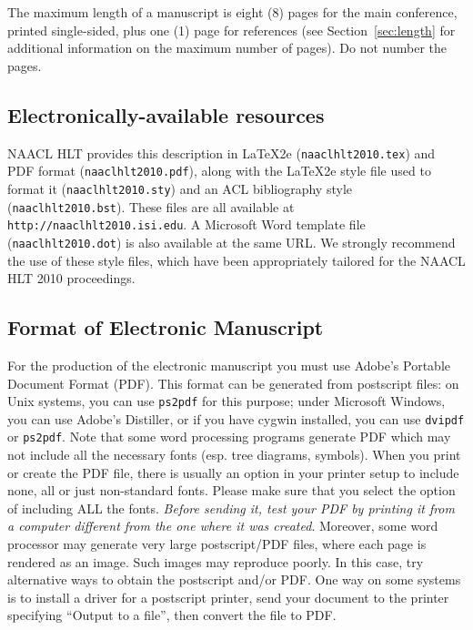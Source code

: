 \documentclass[11pt,letterpaper]{article}
\begin{document}
The maximum length of a manuscript is eight (8) pages for the main
conference, printed single-sided, plus one (1) page for references
(see Section~\ref{sec:length} for additional information on the
maximum number of pages).  Do not number the pages.

\subsection{Electronically-available resources}

NAACL HLT provides this description in \LaTeX2e{} ({\tt naaclhlt2010.tex}) and PDF
format ({\tt naaclhlt2010.pdf}), along with the \LaTeX2e{} style file used to
format it ({\tt naaclhlt2010.sty}) and an ACL bibliography style ({\tt naaclhlt2010.bst}).
These files are all available at
{\tt http://naaclhlt2010.isi.edu}.  A Microsoft Word
template file ({\tt naaclhlt2010.dot}) is also available at the same URL. We
strongly recommend the use of these style files, which have been
appropriately tailored for the NAACL HLT 2010 proceedings.


\subsection{Format of Electronic Manuscript}
\label{sect:pdf}

For the production of the electronic manuscript you must use Adobe's
Portable Document Format (PDF). This format can be generated from
postscript files: on Unix systems, you can use {\tt ps2pdf} for this
purpose; under Microsoft Windows, you can use Adobe's Distiller, or
if you have cygwin installed, you can use {\tt dvipdf} or
{\tt ps2pdf}.  Note 
that some word processing programs generate PDF which may not include
all the necessary fonts (esp. tree diagrams, symbols). When you print
or create the PDF file, there is usually an option in your printer
setup to include none, all or just non-standard fonts.  Please make
sure that you select the option of including ALL the fonts.  {\em
  Before sending it, test your {\/\em PDF} by printing it from a
  computer different from the one where it was created}. Moreover,
some word processor may generate very large postscript/PDF files,
where each page is rendered as an image. Such images may reproduce
poorly.  In this case, try alternative ways to obtain the postscript
and/or PDF.  One way on some systems is to install a driver for a
postscript printer, send your document to the printer specifying
``Output to a file'', then convert the file to PDF.
\end{document}
